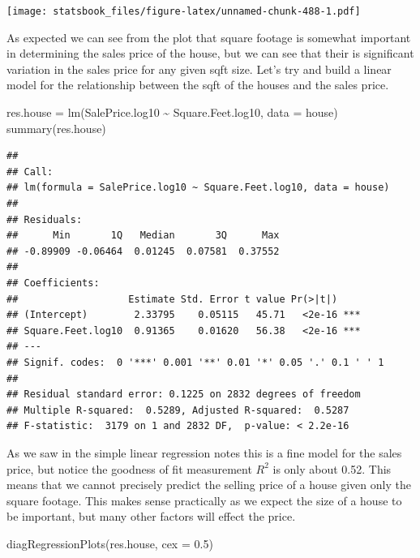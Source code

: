\documentclass[
]{book}
\newenvironment{Shaded}{\begin{snugshade}}{\end{snugshade}}
\newcommand{\AttributeTok}[1]{\textcolor[rgb]{0.77,0.63,0.00}{#1}}
\newcommand{\FloatTok}[1]{\textcolor[rgb]{0.00,0.00,0.81}{#1}}
\newcommand{\FunctionTok}[1]{\textcolor[rgb]{0.00,0.00,0.00}{#1}}
\newcommand{\NormalTok}[1]{#1}
\newcommand{\OtherTok}[1]{\textcolor[rgb]{0.56,0.35,0.01}{#1}}
\newcommand{\SpecialCharTok}[1]{\textcolor[rgb]{0.00,0.00,0.00}{#1}}
\theoremstyle{definition}
\theoremstyle{definition}
\theoremstyle{definition}
\theoremstyle{definition}
\theoremstyle{remark}
\begin{document}
\texttt{[image: statsbook\_files/figure-latex/unnamed-chunk-488-1.pdf]}

As expected we can see from the plot that square footage is somewhat important in determining the sales price of the house, but we can see that their is significant variation in the sales price for any given sqft size. Let's try and build a linear model for the relationship between the sqft of the houses and the sales price.

\begin{Shaded}
\begin{Highlighting}[]
\NormalTok{res.house }\OtherTok{=} \FunctionTok{lm}\NormalTok{(SalePrice.log10 }\SpecialCharTok{\textasciitilde{}}\NormalTok{ Square.Feet.log10, }\AttributeTok{data =}\NormalTok{ house)}
\FunctionTok{summary}\NormalTok{(res.house)}
\end{Highlighting}
\end{Shaded}

\begin{verbatim}
## 
## Call:
## lm(formula = SalePrice.log10 ~ Square.Feet.log10, data = house)
## 
## Residuals:
##      Min       1Q   Median       3Q      Max 
## -0.89909 -0.06464  0.01245  0.07581  0.37552 
## 
## Coefficients:
##                   Estimate Std. Error t value Pr(>|t|)    
## (Intercept)        2.33795    0.05115   45.71   <2e-16 ***
## Square.Feet.log10  0.91365    0.01620   56.38   <2e-16 ***
## ---
## Signif. codes:  0 '***' 0.001 '**' 0.01 '*' 0.05 '.' 0.1 ' ' 1
## 
## Residual standard error: 0.1225 on 2832 degrees of freedom
## Multiple R-squared:  0.5289, Adjusted R-squared:  0.5287 
## F-statistic:  3179 on 1 and 2832 DF,  p-value: < 2.2e-16
\end{verbatim}

As we saw in the simple linear regression notes this is a fine model for the sales price, but notice the goodness of fit measurement \(R^2\) is only about 0.52. This means that we cannot precisely predict the selling price of a house given only the square footage. This makes sense practically as we expect the size of a house to be important, but many other factors will effect the price.

\begin{Shaded}
\begin{Highlighting}[]
\FunctionTok{diagRegressionPlots}\NormalTok{(res.house, }\AttributeTok{cex =} \FloatTok{0.5}\NormalTok{)}
\end{Highlighting}
\end{Shaded}
\end{document}
